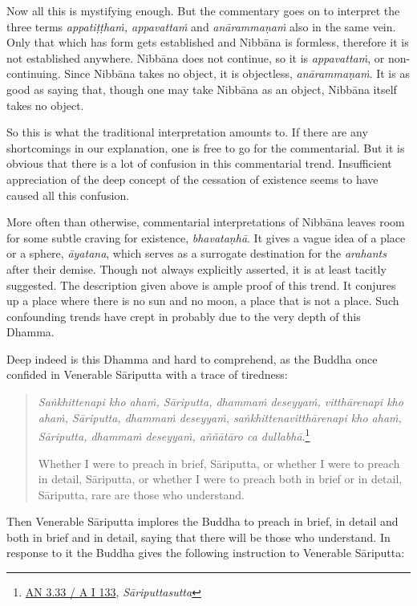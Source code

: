 Now all this is mystifying enough. But the commentary goes on to interpret the three terms \emph{appatiṭṭhaṁ, appavattaṁ} and \emph{anārammaṇaṁ} also in the same vein. Only that which has form gets established and Nibbāna is formless, therefore it is not established anywhere. Nibbāna does not continue, so it is \emph{appavattaṁ}, or non-continuing. Since Nibbāna takes no object, it is objectless, \emph{anārammaṇaṁ}. It is as good as saying that, though one may take Nibbāna as an object, Nibbāna itself takes no object.

So this is what the traditional interpretation amounts to. If there are any shortcomings in our explanation, one is free to go for the commentarial. But it is obvious that there is a lot of confusion in this commentarial trend. Insufficient appreciation of the deep concept of the cessation of existence seems to have caused all this confusion.

More often than otherwise, commentarial interpretations of Nibbāna leaves room for some subtle craving for existence, \emph{bhavataṇhā}. It gives a vague idea of a place or a sphere, \emph{āyatana}, which serves as a surrogate destination for the \emph{arahants} after their demise. Though not always explicitly asserted, it is at least tacitly suggested. The description given above is ample proof of this trend. It conjures up a place where there is no sun and no moon, a place that is not a place. Such confounding trends have crept in probably due to the very depth of this Dhamma.

Deep indeed is this Dhamma and hard to comprehend, as the Buddha once confided in Venerable Sāriputta with a trace of tiredness:

\begin{quote}
\emph{Saṅkhittenapi kho ahaṁ, Sāriputta, dhammaṁ deseyyaṁ, vitthārenapi kho ahaṁ, Sāriputta, dhammaṁ deseyyaṁ, saṅkhittenavitthārenapi kho ahaṁ, Sāriputta, dhammaṁ deseyyaṁ, aññātāro ca dullabhā}.\footnote{\href{https://suttacentral.net/an3.33/pli/ms}{AN 3.33 / A I 133}, \emph{Sāriputtasutta}}

Whether I were to preach in brief, Sāriputta, or whether I were to preach in detail, Sāriputta, or whether I were to preach both in brief or in detail, Sāriputta, rare are those who understand.
\end{quote}

Then Venerable Sāriputta implores the Buddha to preach in brief, in detail and both in brief and in detail, saying that there will be those who understand. In response to it the Buddha gives the following instruction to Venerable Sāriputta:

